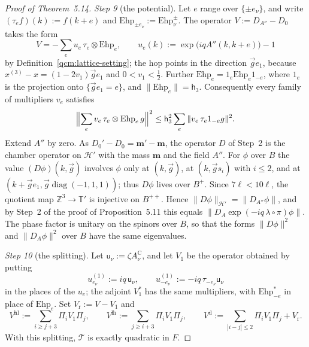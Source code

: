 \documentclass[11pt,letterpaper,reqno]{amsart}
\theoremstyle{definition}
\begin{document}
\begin{proof}[Proof of Theorem~5.14]
\emph{Step 9} (the potential).
Let $e$ range over $\{\pm e_\nu\}$, and write $(\tau_ef)(k):=f(k+e)$ and $\mathrm{Ehp}_{\pm e_\nu}:=\mathrm{Ehp}^\pm_\nu$.
The operator $V:=D_{A''}-D_0$ takes the form
\begin{equation*}
V=-\sum_eu_e\,\tau_e\otimes\mathrm{Ehp}_e,\qquad u_e(k):=\exp\bigl(iqA''(k,k+e)\bigr)-1
\end{equation*}
by Definition~\ref{qcm:lattice-setting};
the hop points in the direction $\vec ge_1$, because $x^{(3)}-x=(1-2v_1)\vec ge_1$ and $0<v_1<\frac12$.
Further $\mathrm{Ehp}_e=1_e\mathrm{Ehp}_e1_{-e}$, where $1_e$ is the projection onto $\{\vec ge_1=e\}$, and $\|\mathrm{Ehp}_e\|=\mathsf h_3$.
Consequently every family of multipliers $v_e$ satisfies
\begin{equation*}
\Bigl\|\sum_ev_e\,\tau_e\otimes\mathrm{Ehp}_e\,g\Bigr\|^2\le\mathsf h_3^2\sum_e\|v_e\,\tau_e1_{-e}g\|^2.
\end{equation*}
Extend $A''$ by zero.
As $D_0'-D_0=\mathbf m'-\mathbf m$, the operator $D$ of Step~2 is the chamber operator on $\mathcal H'$ with the mass $\mathbf m$ and the field $A''$.
For $\phi$ over $B$ the value $(D\phi)(k,\vec g)$ involves $\phi$ only at $(k,\vec g)$, at $(k,\vec gs_i)$ with $i\le2$, and at $(k+\vec ge_1,\vec g\operatorname{diag}(-1,1,1))$;
thus $D\phi$ lives over $B^+$.
Since $7\ell<10\ell$, the quotient map $\mathbb Z^3\to\mathbb T'$ is injective on $B^{++}$.
Hence $\|D\phi\|_{\mathcal H'}=\|D_{A''}\phi\|$, and by Step~2 of the proof of Proposition~5.11 this equals $\|D_A\exp(-iq\,\lambda\circ\pi)\phi\|$.
The phase factor is unitary on the spinors over $B$, so that the forms $\|D\phi\|^2$ and $\|D_A\phi\|^2$ over $B$ have the same eigenvalues.

\emph{Step 10} (the splitting).
Let $\mathsf u_\nu:=\zeta A^{\mathrm C}_\nu$, and let $V_1$ be the operator obtained by putting
\begin{equation*}
u^{(1)}_{e_\nu}:=iq\,\mathsf u_\nu,\qquad u^{(1)}_{-e_\nu}:=-iq\,\tau_{-e_\nu}\mathsf u_\nu
\end{equation*}
in the places of the $u_e$;
the adjoint $V_1^*$ has the same multipliers, with $\mathrm{Ehp}_{-e}^*$ in place of $\mathrm{Ehp}_e$.
Set $V_{\mathrm r}:=V-V_1$ and
\begin{equation*}
V^{\mathrm{hl}}:=\sum_{i\ge j+3}\Pi_iV_1\Pi_j,\qquad V^{\mathrm{lh}}:=\sum_{j\ge i+3}\Pi_iV_1\Pi_j,\qquad V^{\mathrm d}:=\sum_{|i-j|\le2}\Pi_iV_1\Pi_j+V_{\mathrm r}.
\end{equation*}
With this splitting, $\mathcal T$ is exactly quadratic in $F$.


\end{proof}
\end{document}
